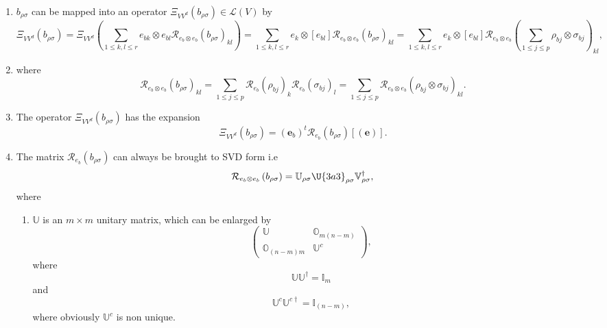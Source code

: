 \documentclass[aps,preprint]{revtex4}
\begin{document}
\begin{enumerate}
\item $b_{\rho \sigma }$ can be mapped into an operator $\Xi _{VV^{d}}\left(
b_{\rho \sigma }\right) \in \mathcal{L}\left( V\right) $ by 
\begin{equation}
\Xi _{VV^{d}}\left( b_{\rho \sigma }\right) =\Xi _{VV^{d}}\left( \sum_{1\leq
k,l\leq r}e_{bk}\otimes e_{bl}\mathcal{R}_{e_{b}\otimes e_{b}}\left( b_{\rho
\sigma }\right) _{kl}\right) =\sum_{1\leq k,l\leq r}e_{k}\otimes \left[
e_{bl}\right] \mathcal{R}_{e_{b}\otimes e_{b}}\left( b_{\rho \sigma }\right)
_{kl}=\sum_{1\leq k,l\leq r}e_{k}\otimes \left[ e_{bl}\right] \mathcal{R}%
_{e_{b}\otimes e_{b}}\left( \sum_{1\leq j\leq p}\rho _{bj}\otimes \sigma
_{bj}\right) _{kl},
\end{equation}

\item where 
\begin{equation}
\mathcal{R}_{e_{b}\otimes e_{b}}\left( b_{\rho \sigma }\right)
_{kl}=\sum_{1\leq j\leq p}\mathcal{R}_{e_{b}}\left( \rho _{bj}\right) _{k}%
\mathcal{R}_{e_{b}}\left( \sigma _{bj}\right) _{l}=\sum_{1\leq j\leq p}%
\mathcal{R}_{e_{b}\otimes e_{b}}\left( \rho _{bj}\otimes \sigma _{bj}\right)
_{kl}.
\end{equation}

\item The operator $\Xi _{VV^{d}}\left( b_{\rho \sigma }\right) $ has the
expansion 
\begin{equation}
\Xi _{VV^{d}}\left( b_{\rho \sigma }\right) =\left( \boldsymbol{e}%
_{b}\right) ^{t}\mathcal{R}_{e_{b}}\left( b_{\rho \sigma }\right) \left[
\left( \boldsymbol{e}\right) \right] .
\end{equation}

\item The matrix $\mathcal{R}_{e_{b}}\left( b_{\rho \sigma }\right) $ can
always be brought to SVD form i.e 
\begin{equation}
\mathcal{R}_{e_{b}\otimes e_{b}}\left( b_{\rho \sigma }\right) =\mathbb{U}%
_{\rho \sigma }\U{3a3} _{\rho \sigma }\mathbb{V}_{\rho \sigma }^{\dagger },
\end{equation}%
where

\begin{enumerate}
\item $\mathbb{U}$ is an $m\times m$ unitary matrix, which can be enlarged
by 
\begin{equation}
\left( 
\begin{array}{cc}
\mathbb{U} & \mathbb{O}_{m\left( n-m\right) } \\ 
\mathbb{O}_{\left( n-m\right) m} & \mathbb{U}^{c}%
\end{array}%
\right) ,
\end{equation}%
where 
\begin{equation}
\mathbb{UU}^{\dagger }=\mathbb{I}_{m}
\end{equation}%
and 
\begin{equation}
\mathbb{U}^{c}\mathbb{U}^{c\dagger }=\mathbb{I}_{\left( n-m\right) },
\end{equation}%
where obviously $\mathbb{U}^{c}$ is non unique.


\end{enumerate}
\end{enumerate}
\end{document}
